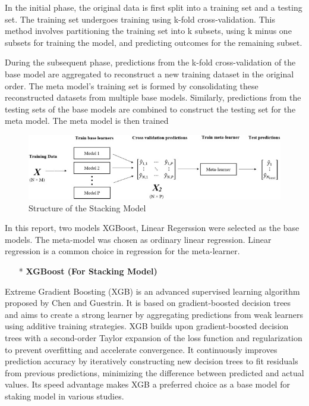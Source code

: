 \documentclass{ieeeojies}
\begin{document}
In the initial phase, the original data is first split into a training set and a testing set. The training set undergoes training using k-fold cross-validation. This method involves partitioning the training set into k subsets, using k minus one subsets for training the model, and predicting outcomes for the remaining subset.

During the subsequent phase, predictions from the k-fold cross-validation of the base model are aggregated to reconstruct a new training dataset in the original order. The meta model's training set is formed by consolidating these reconstructed datasets from multiple base models. Similarly, predictions from the testing sets of the base models are combined to construct the testing set for the meta model. The meta model is then trained

\begin{figure}[H]
  \centering
  \begin{minipage}{1.0\linewidth}
    \centering
    \includegraphics[width=\linewidth]{Figure_algorithm/stackingmodel.jpg}
    \caption{Structure of the Stacking Model \cite{stack_fig}}
  \end{minipage}
\end{figure}

In this report, two models XGBoost, Linear Regerssion  were selected as the base models. The meta-model was chosen as ordinary linear regression. Linear regression is a common choice in regression for the meta-learner.

\begin{itemize}
    \item[*] \textbf{XGBoost (For Stacking Model)}
\end{itemize} 

Extreme Gradient Boosting (XGB) is an advanced supervised learning algorithm proposed by Chen and Guestrin. It is based on gradient-boosted decision trees and aims to create a strong learner by aggregating predictions from weak learners using additive training strategies. XGB builds upon gradient-boosted decision trees with a second-order Taylor expansion of the loss function and regularization to prevent overfitting and accelerate convergence. It continuously improves prediction accuracy by iteratively constructing new decision trees to fit residuals from previous predictions, minimizing the difference between predicted and actual values. Its speed advantage makes XGB a preferred choice as a base model for staking model in various studies.\cite{stacking}
\end{document}
